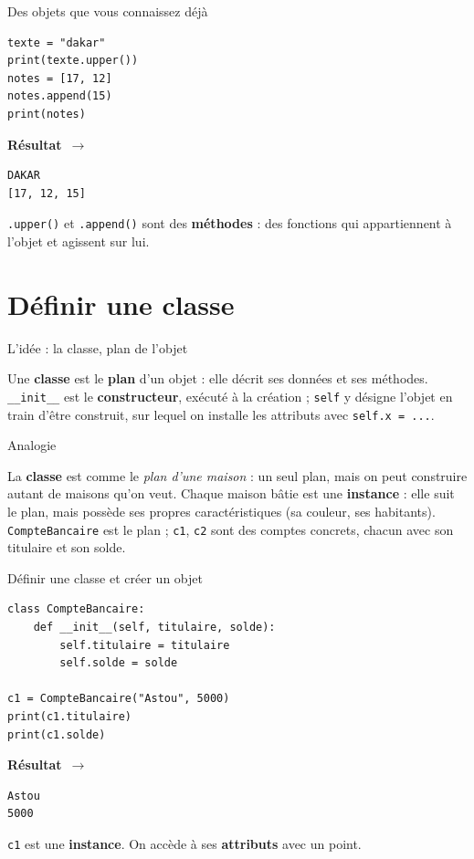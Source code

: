 \documentclass[aspectratio=169,11pt]{beamer}
\newcommand{\resultat}{{\scriptsize\textbf{R\'esultat}~$\rightarrow$}\par\vspace{1pt}}
\begin{document}
\begin{frame}[fragile]{Des objets que vous connaissez déjà}
\begin{lstlisting}
texte = "dakar"
print(texte.upper())
notes = [17, 12]
notes.append(15)
print(notes)
\end{lstlisting}
\resultat
\begin{lstlisting}[style=out]
DAKAR
[17, 12, 15]
\end{lstlisting}
{\small \texttt{.upper()} et \texttt{.append()} sont des \textbf{méthodes} : des fonctions qui appartiennent à l'objet et agissent sur lui.}
\end{frame}

\section{Définir une classe}

\begin{frame}{L'idée : la classe, plan de l'objet}
\begin{ucaddef}
{\small Une \textbf{classe} est le \textbf{plan} d'un objet : elle décrit ses données et ses méthodes. \texttt{\_\_init\_\_} est le \textbf{constructeur}, exécuté à la création ; \texttt{self} y désigne l'objet en train d'être construit, sur lequel on installe les attributs avec \texttt{self.x = ...}.}
\end{ucaddef}
\end{frame}

\begin{frame}{Analogie}
\begin{ucadfront}
{\small La \textbf{classe} est comme le \emph{plan d'une maison} : un seul plan, mais on peut construire autant de maisons qu'on veut. Chaque maison bâtie est une \textbf{instance} : elle suit le plan, mais possède ses propres caractéristiques (sa couleur, ses habitants). \texttt{CompteBancaire} est le plan ; \texttt{c1}, \texttt{c2} sont des comptes concrets, chacun avec son titulaire et son solde.}
\end{ucadfront}
\end{frame}

\begin{frame}[fragile]{Définir une classe et créer un objet}
\begin{lstlisting}
class CompteBancaire:
    def __init__(self, titulaire, solde):
        self.titulaire = titulaire
        self.solde = solde

c1 = CompteBancaire("Astou", 5000)
print(c1.titulaire)
print(c1.solde)
\end{lstlisting}
\resultat
\begin{lstlisting}[style=out]
Astou
5000
\end{lstlisting}
{\small \texttt{c1} est une \textbf{instance}. On accède à ses \textbf{attributs} avec un point.}
\end{frame}
\end{document}
